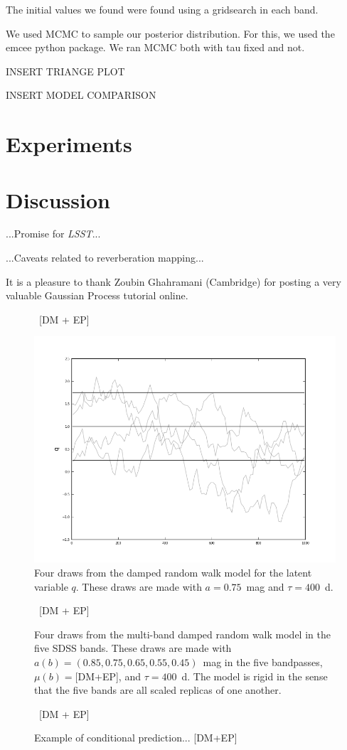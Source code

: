 \documentclass[letterpaper,12pt,preprint]{aastex}
\newcommand{\project}[1]{\textsl{#1}}
\newcommand{\lsst}{\project{LSST}}
\begin{document}
The initial values we found were found using a gridsearch in each band.


We used MCMC to sample our posterior distribution. For this, we used the emcee python package. We ran MCMC both with tau fixed and not. 

INSERT TRIANGE PLOT

INSERT MODEL COMPARISON


\section{Experiments}

\section{Discussion}

...Promise for \lsst...

...Caveats related to reverberation mapping...

It is a pleasure to thank Zoubin Ghahramani (Cambridge) for posting a
very valuable Gaussian Process tutorial online.

\clearpage
\begin{figure}
~[DM + EP]~
\caption{Four draws from the damped random walk model for the latent
  variable $q$.  These draws are made with $a=0.75$~mag and
  $\tau=400$~d.\label{fig:qdraws}}
\includegraphics [width=\textwidth]{latentvar.png}
\end{figure}

\begin{figure}
~[DM + EP]~
\caption{Four draws from the multi-band damped random walk model in
  the five SDSS bands.  These draws are made with $a(b)=(0.85, 0.75,
  0.65, 0.55, 0.45)$~mag in the five bandpasses, $\mu(b)=$[DM+EP], and
  $\tau=400$~d.  The model is rigid in the sense that the five bands
  are all scaled replicas of one another.\label{fig:mdraws}}
\end{figure}

\begin{figure}
~[DM + EP]~
\caption{Example of conditional
  prediction... [DM+EP]\label{fig:conditional}}
\end{figure}
\end{document}

